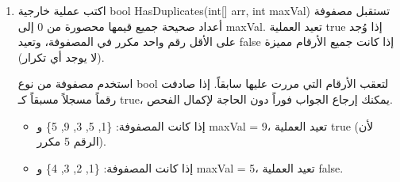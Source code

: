 \documentclass[14pt]{extarticle}
\begin{document}
\begin{enumerate}[itemsep=2em]
    \begin{boxExample}
    إذا كانت المصفوفة المُدخلة: \textenglish{\{2, 20, 0, 14, 2\}} \\
    فإن العملية تعيد مصفوفة طولها 11، بحيث يكون:
    \begin{itemize}
        \item الفهرس 1 (الذي يمثل الرقم 2) قيمته 2.
        \item الفهرس 10 (الذي يمثل الرقم 20) قيمته 1.
    \end{itemize}
    \end{boxExample}

    \ifwithsols
    \begin{boxSolution}
    \begin{english}
    \begin{verbatim}
public static int[] GetEvenFrequencies0To20(int[] arr)
{
    int[] freq = new int[11]; // 20 / 2 + 1 = 11
    for (int i = 0; i < arr.Length; i++)
    {
        int index = arr[i] / 2; // القسمة على 2 تعطي الفهرس
        freq[index]++;
    }
    return freq;
}
    \end{verbatim}
    \end{english}
    \end{boxSolution}
    \clearpage
    \fi


    \item
    اكتب عملية خارجية \textenglish{bool HasDuplicates(int[] arr, int maxVal)} تستقبل مصفوفة أعداد صحيحة جميع قيمها محصورة من 0 إلى \textenglish{maxVal}. تعيد العملية \textenglish{true} إذا وُجد على الأقل رقم واحد مكرر في المصفوفة، وتعيد \textenglish{false} إذا كانت جميع الأرقام مميزة (لا يوجد أي تكرار).

    \begin{boxHint}
    استخدم مصفوفة من نوع \textenglish{bool} لتعقب الأرقام التي مررت عليها سابقاً. إذا صادفت رقماً مسجلاً مسبقاً كـ \textenglish{true}، يمكنك إرجاع الجواب فوراً دون الحاجة لإكمال الفحص.
    \end{boxHint}

    \begin{boxExample}
    \begin{itemize}
        \item إذا كانت المصفوفة: \textenglish{\{1, 5, 3, 9, 5\}} و \textenglish{maxVal = 9}، تعيد العملية \textenglish{true} (لأن الرقم 5 مكرر).
        \item إذا كانت المصفوفة: \textenglish{\{1, 2, 3, 4\}} و \textenglish{maxVal = 5}، تعيد العملية \textenglish{false}.
    \end{itemize}
    \end{boxExample}


\end{enumerate}
\end{document}
